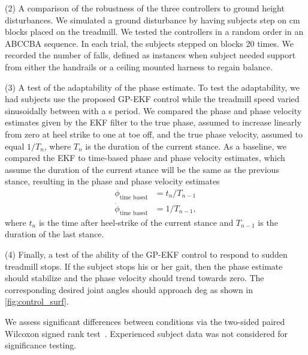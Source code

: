 (2) A comparison of the robustness of the three controllers to ground height
disturbances. We simulated a ground disturbance by having subjects step on
\unit[3]{cm} blocks placed on the treadmill. We tested the controllers in a
random order in an ABCCBA sequence.  In each trial, the subjects stepped on
blocks 20 times. We recorded the number of falls, defined as instances when
subject needed support from either the handrails or a ceiling mounted harness to
regain balance.


(3) A test of the adaptability of the phase estimate.  To test the adaptability,
we had subjects use the proposed GP-EKF control while the treadmill speed varied
sinusoidally between  with a \unit[20]{s} period. We
compared the phase and phase velocity estimates given by the EKF filter to the
true phase, assumed to increase linearly from zero at heel strike to one at toe
off, and the true phase velocity, assumed to equal $1/T_n$, where $T_n$ is the
duration of the current stance. As a baseline, we compared the EKF to time-based
phase and phase velocity estimates, which assume the duration of the current
stance will be the same as the previous stance, resulting in the phase and phase
velocity estimates
\begin{align}
    \phi_\textrm{time based} &= t_n/T_{n-1} \\
    \dot{\phi}_\textrm{time based} &= 1/T_{n-1}, \label{eq:init_cond_time}
\end{align}
where $t_n$ is the time after heel-strike of the current stance and $T_{n-1}$ is
the duration of the last stance. 

(4) Finally, a test of the ability of the GP-EKF control to respond to sudden
treadmill stops. If the subject stops his or her gait, then the phase estimate
should stabilize and the phase velocity should trend towards zero. The
corresponding desired joint angles should approach \unit[5]{deg} as shown in
\cref{fig:control_surf}. 

We assess significant differences between conditions via the two-sided paired
Wilcoxon signed rank test~\citep{gibbons2011nonparametric}. Experienced subject
data was not considered for significance testing.
